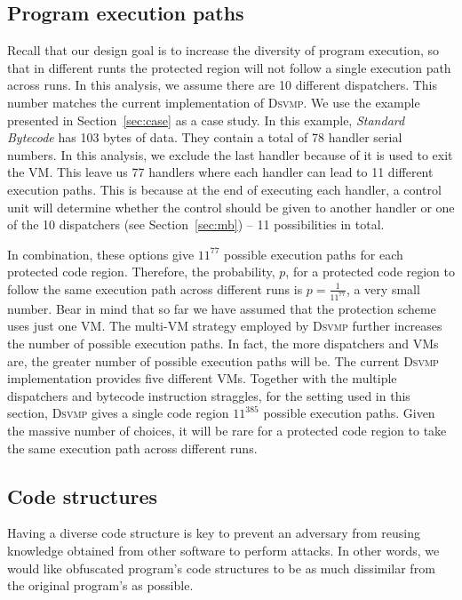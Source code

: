 \documentclass[preprint,12pt,3p]{elsarticle}
\newcommand{\DSVMP}{\textsc{Dsvmp}\xspace}
\begin{document}
\subsection{Program execution paths}
Recall that our design goal is to increase the diversity of program execution,
so that in different runts the protected region will not follow a single execution path across runs.
In this analysis, we assume there are 10 different dispatchers. This number matches the current implementation of \DSVMP.
We use the example presented in Section~\ref{sec:case} as a case study.
In this example, \emph{Standard Bytecode} has 103 bytes of data.
They contain a total of 78 handler serial numbers. In this analysis, we exclude the last handler because of it is used to exit the VM.
This leave us 77 handlers where each handler can lead to 11 different execution paths.
This is because at the end of executing each handler, a control unit will determine whether the control
should be given to another handler or one of the 10 dispatchers (see Section~\ref{sec:mb}) -- 11 possibilities in total.

In combination, these options give $11^{77}$ possible execution paths for each protected code region.
Therefore, the probability, $p$, for a protected code region to follow the same execution path across
different runs is $p= \frac{1}{{{{11}^{77}}}}$,
a very small number.
Bear in mind that so far we have assumed that the protection scheme uses just one VM.
The multi-VM strategy employed by \DSVMP further increases the number of possible execution paths.
In fact, the more dispatchers and VMs are, the greater number of possible execution paths will be.
The current \DSVMP implementation provides five different VMs. Together with the multiple dispatchers
and bytecode instruction straggles, for the setting used in this section, \DSVMP gives a single code region
$11^{385}$ possible execution paths. Given the massive number of choices, it will be rare for
a protected code region to take the same execution path across different runs.




\subsection{Code structures}
Having a diverse code structure is key to prevent an adversary from reusing knowledge obtained from other software to perform attacks. In other words,
we would like obfuscated program's code structures to be as much dissimilar from the original program's as possible.
\end{document}
